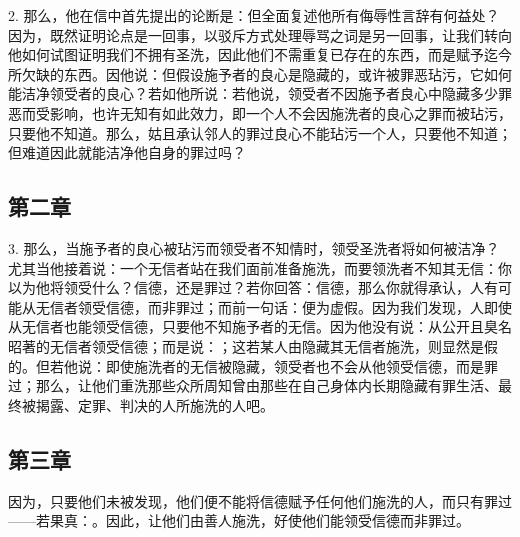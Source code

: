 2. 那么，他在信中首先提出的论断是：但全面复述他所有侮辱性言辞有何益处？因为，既然证明论点是一回事，以驳斥方式处理辱骂之词是另一回事，让我们转向他如何试图证明我们不拥有圣洗，因此他们不需重复已存在的东西，而是赋予迄今所欠缺的东西。因他说：但假设施予者的良心是隐藏的，或许被罪恶玷污，它如何能洁净领受者的良心？若如他所说：若他说，领受者不因施予者良心中隐藏多少罪恶而受影响，也许无知有如此效力，即一个人不会因施洗者的良心之罪而被玷污，只要他不知道。那么，姑且承认邻人的罪过良心不能玷污一个人，只要他不知道；但难道因此就能洁净他自身的罪过吗？\par


\subsection{第二章}

3. 那么，当施予者的良心被玷污而领受者不知情时，领受圣洗者将如何被洁净？尤其当他接着说：一个无信者站在我们面前准备施洗，而要领洗者不知其无信：你以为他将领受什么？信德，还是罪过？若你回答：信德，那么你就得承认，人有可能从无信者领受信德，而非罪过；而前一句话：便为虚假。因为我们发现，人即使从无信者也能领受信德，只要他不知施予者的无信。因为他没有说：从公开且臭名昭著的无信者领受信德；而是说：；这若某人由隐藏其无信者施洗，则显然是假的。但若他说：即使施洗者的无信被隐藏，领受者也不会从他领受信德，而是罪过；那么，让他们重洗那些众所周知曾由那些在自己身体内长期隐藏有罪生活、最终被揭露、定罪、判决的人所施洗的人吧。\par


\subsection{第三章}

因为，只要他们未被发现，他们便不能将信德赋予任何他们施洗的人，而只有罪过——若果真：。因此，让他们由善人施洗，好使他们能领受信德而非罪过。\par

